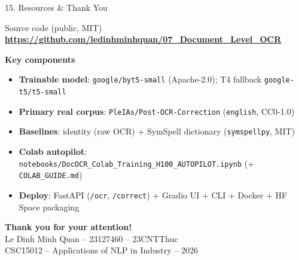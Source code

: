 \documentclass[10pt,aspectratio=169]{beamer}
\begin{document}
\begin{frame}{15. Resources \& Thank You}
\begin{block}{Source code (public, MIT)}
\centering
\large \textbf{\url{https://github.com/ledinhminhquan/07_Document_Level_OCR}}
\end{block}

\textbf{Key components}
\begin{itemize}\scriptsize
  \item \textbf{Trainable model}: \texttt{google/byt5-small} (Apache-2.0); T4 fallback \texttt{google-t5/t5-small}
  \item \textbf{Primary real corpus}: \texttt{PleIAs/Post-OCR-Correction} (\texttt{english}, CC0-1.0)
  \item \textbf{Baselines}: identity (raw OCR) + SymSpell dictionary (\texttt{symspellpy}, MIT)
  \item \textbf{Colab autopilot}: \texttt{notebooks/DocOCR\_Colab\_Training\_H100\_AUTOPILOT.ipynb} (+ \texttt{COLAB\_GUIDE.md})
  \item \textbf{Deploy}: FastAPI (\texttt{/ocr}, \texttt{/correct}) + Gradio UI + CLI + Docker + HF Space packaging
\end{itemize}

\vspace{0.3cm}
\centering
\Large\textbf{Thank you for your attention!}\\[0.2cm]
\normalsize Le Dinh Minh Quan -- 23127460 -- 23CNTThuc \\
\small CSC15012 -- Applications of NLP in Industry -- 2026
\end{frame}
\end{document}
